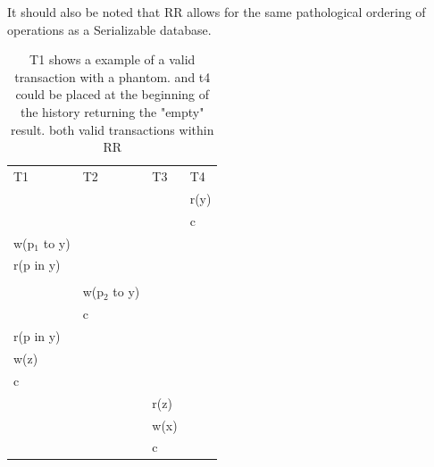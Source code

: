 \documentclass[a4paper,10pt,titlepage]{report}
\begin{document}
It should also be noted that RR allows for the same pathological ordering of operations as a Serializable database.

\begin{table}[h]
\begin{tabular}{l|l|l|l}
T1   & T2   & T3   & T4   \\
     &      &      & r(y) \\
     &      &      & c    \\
w(p$_1$ to y) &      &      &      \\
r(p in y) &      &      &      \\
     &      &      &      \\
     & w(p$_2$ to y) &      &      \\
     & c    &      &      \\
r(p in y) &      &      &      \\
w(z) &      &      &      \\
c    &      &      &      \\
     &      & r(z) &      \\
     &      & w(x) &      \\
     &      & c    &      
\end{tabular}
\caption{T1 shows a example of a valid transaction with a phantom. and t4 could be placed at the beginning of the history returning the "empty" result. both valid transactions within RR}
\end{table}
\end{document}
